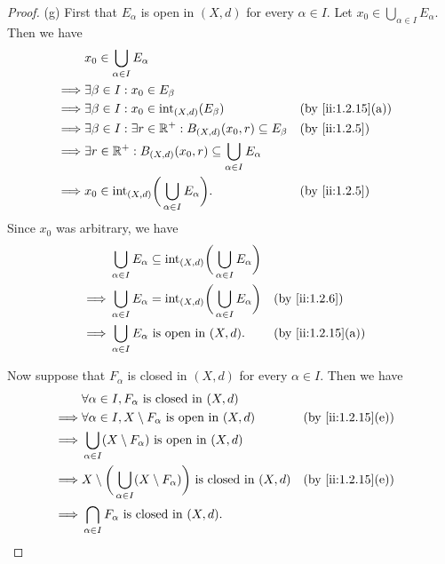 \begin{proof}{(g)}
  First that \(E_\alpha\) is open in \((X, d)\) for every \(\alpha \in I\).
  Let \(x_0 \in \bigcup_{\alpha \in I} E_\alpha\).
  Then we have
  \begin{align*}
             & x_0 \in \bigcup_{\alpha \in I} E_\alpha                                                                  \\
    \implies & \exists \beta \in I : x_0 \in E_\beta                                                                    \\
    \implies & \exists \beta \in I : x_0 \in \text{int}_{(X, d)}(E_\beta)                        &  & \by{ii:1.2.15}[a] \\
    \implies & \exists \beta \in I : \exists r \in \R^+ : B_{(X, d)}(x_0, r) \subseteq E_\beta   &  & \by{ii:1.2.5}     \\
    \implies & \exists r \in \R^+ : B_{(X, d)}(x_0, r) \subseteq \bigcup_{\alpha \in I} E_\alpha                        \\
    \implies & x_0 \in \text{int}_{(X, d)}\bigg(\bigcup_{\alpha \in I} E_\alpha\bigg).           &  & \by{ii:1.2.5}
  \end{align*}
  Since \(x_0\) was arbitrary, we have
  \begin{align*}
             & \bigcup_{\alpha \in I} E_\alpha \subseteq \text{int}_{(X, d)}\bigg(\bigcup_{\alpha \in I} E_\alpha\bigg)                        \\
    \implies & \bigcup_{\alpha \in I} E_\alpha = \text{int}_{(X, d)}\bigg(\bigcup_{\alpha \in I} E_\alpha\bigg)         &  & \by{ii:1.2.6}     \\
    \implies & \bigcup_{\alpha \in I} E_\alpha \text{ is open in } (X, d).                                              &  & \by{ii:1.2.15}[a]
  \end{align*}

  Now suppose that \(F_\alpha\) is closed in \((X, d)\) for every \(\alpha \in I\).
  Then we have
  \begin{align*}
             & \forall \alpha \in I, F_\alpha \text{ is closed in } (X, d)                                                               \\
    \implies & \forall \alpha \in I, X \setminus F_\alpha \text{ is open in } (X, d)                              &  & \by{ii:1.2.15}[e] \\
    \implies & \bigcup_{\alpha \in I} (X \setminus F_\alpha) \text{ is open in } (X, d)                                                  \\
    \implies & X \setminus \bigg(\bigcup_{\alpha \in I} (X \setminus F_\alpha)\bigg) \text{ is closed in } (X, d) &  & \by{ii:1.2.15}[e] \\
    \implies & \bigcap_{\alpha \in I} F_\alpha \text{ is closed in } (X, d).
  \end{align*}
\end{proof}

